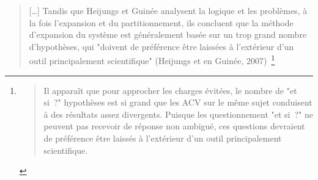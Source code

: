\blockcquote[traduction]{cherubini_influence_2011}{
[\ldots] Tandis que Heijungs et Guinée analysent la logique et les problèmes, à la fois l'expansion et du partitionnement, ils concluent que la méthode d'expansion du système est généralement basée sur un trop grand nombre d'hypothèses, qui "doivent de préférence être laissées à l'extérieur d'un outil principalement scientifique" (Heijungs et en Guinée, 2007)~\cite{heijungs_allocation_2007}\footnote{\blockcquote[traduction]{heijungs_allocation_2007}{
Il apparaît que pour approcher les charges évitées, le nombre de "et si~?" hypothèses est si grand que les ACV sur le même sujet conduisent à des résultats assez divergents.
Puisque les questionnement "et si~?" ne peuvent pas recevoir de réponse non ambiguë, ces questions devraient de préférence être laissés à l'extérieur d'un outil principalement scientifique.
}.
}}.

